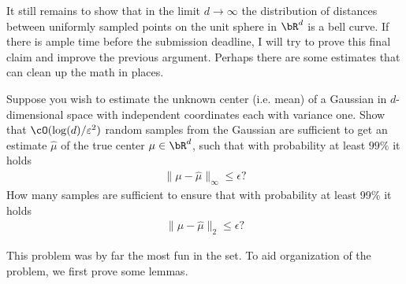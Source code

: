 \begin{homework}[e]
\begin{soln}
    It still remains to show that in the limit $d \to \infty$ the distribution of distances between uniformly sampled points on the unit sphere in $\bR^d$ is a bell curve. If there is ample time before the submission deadline, I will try to prove this final claim and improve the previous argument. Perhaps there are some estimates that can clean up the math in places.
  \end{soln}

  \prob Suppose you wish to estimate the unknown center (i.e. mean) of a Gaussian in $d$-dimensional space with independent coordinates each with variance one. Show that $\cO(\log(d)/\epsilon^2)$ random samples from the Gaussian are sufficient to get an estimate $\hat{\mu}$ of the true center $\mu \in \bR^d$, such that with probability at least $99\%$ it holds
  \begin{align*}
    \|\mu - \hat\mu\|_\infty \leq \epsilon?
  \end{align*}
  How many samples are sufficient to ensure that with probability at least 99\% it holds
  \begin{align*}
    \|\mu - \hat\mu\|_2 \leq \epsilon?
  \end{align*}
  \begin{prf}
    This problem was by far the most fun in the set. To aid organization of the problem, we first prove some lemmas.


\end{prf}
\end{homework}
